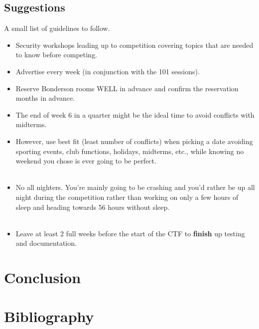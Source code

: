 \documentclass[10pt]{article}
\begin{document}
\subsection{Suggestions}
A small list of guidelines to follow.
\begin{itemize}
\item Security workshops leading up to competition covering topics that are
  needed to know before competing.
\item Advertise every week (in conjunction with the 101 sessions).
\item Reserve Bonderson rooms WELL in advance and confirm the reservation months in
  advance.
\item The end of week 6 in a quarter might be the ideal time to avoid conflicts with
midterms. 
\item However, use best fit (least number of conflicts) when picking a date
avoiding sporting events, club functions, holidays, midterms, etc., while
knowing no weekend you chose is ever going to be perfect.\\ \\

\item No all nighters. You're mainly going to be crashing and you'd rather be up all
night during the competition rather than working on only a few hours of sleep
and heading towards 56 hours without sleep.\\ \\

\item Leave at least 2 full weeks before the start of the CTF to \textbf{finish} up
  testing and documentation.

\end{itemize}

\section{Conclusion}

\newpage
\nocite{*}
\section{Bibliography}




\end{document}
